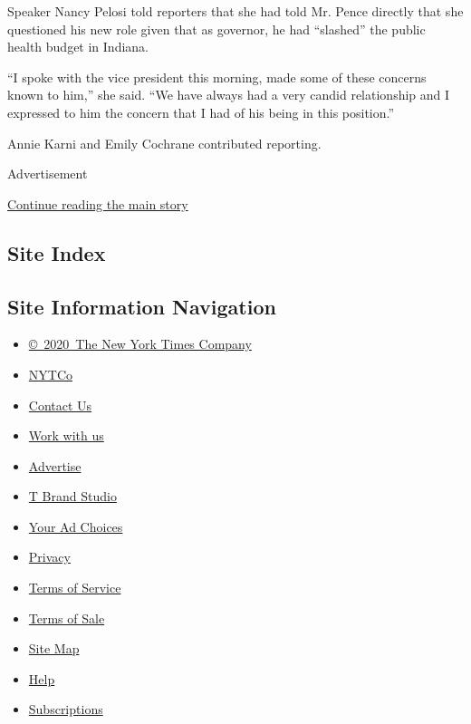 Speaker Nancy Pelosi told reporters that she had told Mr. Pence directly
that she questioned his new role given that as governor, he had
``slashed'' the public health budget in Indiana.

``I spoke with the vice president this morning, made some of these
concerns known to him,'' she said. ``We have always had a very candid
relationship and I expressed to him the concern that I had of his being
in this position.''

Annie Karni and Emily Cochrane contributed reporting.

Advertisement

\protect\hyperlink{after-bottom}{Continue reading the main story}

\hypertarget{site-index}{%
\subsection{Site Index}\label{site-index}}

\hypertarget{site-information-navigation}{%
\subsection{Site Information
Navigation}\label{site-information-navigation}}

\begin{itemize}
\tightlist
\item
  \href{https://help.nytimes3xbfgragh.onion/hc/en-us/articles/115014792127-Copyright-notice}{©~2020~The
  New York Times Company}
\end{itemize}

\begin{itemize}
\tightlist
\item
  \href{https://www.nytco.com/}{NYTCo}
\item
  \href{https://help.nytimes3xbfgragh.onion/hc/en-us/articles/115015385887-Contact-Us}{Contact
  Us}
\item
  \href{https://www.nytco.com/careers/}{Work with us}
\item
  \href{https://nytmediakit.com/}{Advertise}
\item
  \href{http://www.tbrandstudio.com/}{T Brand Studio}
\item
  \href{https://www.nytimes3xbfgragh.onion/privacy/cookie-policy\#how-do-i-manage-trackers}{Your
  Ad Choices}
\item
  \href{https://www.nytimes3xbfgragh.onion/privacy}{Privacy}
\item
  \href{https://help.nytimes3xbfgragh.onion/hc/en-us/articles/115014893428-Terms-of-service}{Terms
  of Service}
\item
  \href{https://help.nytimes3xbfgragh.onion/hc/en-us/articles/115014893968-Terms-of-sale}{Terms
  of Sale}
\item
  \href{https://spiderbites.nytimes3xbfgragh.onion}{Site Map}
\item
  \href{https://help.nytimes3xbfgragh.onion/hc/en-us}{Help}
\item
  \href{https://www.nytimes3xbfgragh.onion/subscription?campaignId=37WXW}{Subscriptions}
\end{itemize}
